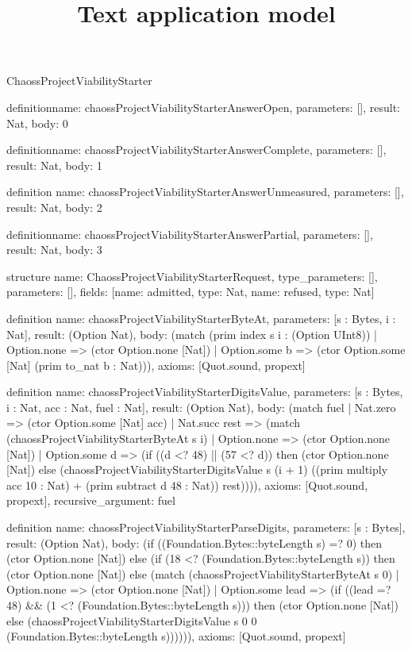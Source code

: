\begin{lexlean}{ChaossProjectViabilityStarter}
\title{Text application model}
\begin{semanticmodule}
definition{name: chaossProjectViabilityStarterAnswerOpen, parameters: [], result: Nat, body: 0}

definition{name: chaossProjectViabilityStarterAnswerComplete, parameters: [], result: Nat, body: 1}

definition{
  name: chaossProjectViabilityStarterAnswerUnmeasured,
  parameters: [],
  result: Nat,
  body: 2
}

definition{name: chaossProjectViabilityStarterAnswerPartial, parameters: [], result: Nat, body: 3}

structure{
  name: ChaossProjectViabilityStarterRequest,
  type_parameters: [],
  parameters: [],
  fields: [{name: admitted, type: Nat}, {name: refused, type: Nat}]
}

definition{
  name: chaossProjectViabilityStarterByteAt,
  parameters: [s : Bytes, i : Nat],
  result: (Option Nat),
  body: (match (prim index s i : (Option UInt8))
    | Option.none => (ctor Option.none [Nat])
    | Option.some b => (ctor Option.some [Nat] (prim to_nat b : Nat))),
  axioms: [Quot.sound, propext]
}

definition{
  name: chaossProjectViabilityStarterDigitsValue,
  parameters: [s : Bytes, i : Nat, acc : Nat, fuel : Nat],
  result: (Option Nat),
  body: (match fuel
    | Nat.zero => (ctor Option.some [Nat] acc)
    | Nat.succ rest => (match (chaossProjectViabilityStarterByteAt s i)
      | Option.none => (ctor Option.none [Nat])
      | Option.some d => (if ((d <? 48) || (57 <? d)) then (ctor Option.none [Nat]) else (chaossProjectViabilityStarterDigitsValue s (i + 1) ((prim multiply acc 10 : Nat) + (prim subtract d 48 : Nat)) rest)))),
  axioms: [Quot.sound, propext],
  recursive_argument: fuel
}

definition{
  name: chaossProjectViabilityStarterParseDigits,
  parameters: [s : Bytes],
  result: (Option Nat),
  body: (if ((Foundation.Bytes::byteLength s) =? 0) then (ctor Option.none [Nat]) else (if (18 <? (Foundation.Bytes::byteLength s)) then (ctor Option.none [Nat]) else (match (chaossProjectViabilityStarterByteAt s 0)
    | Option.none => (ctor Option.none [Nat])
    | Option.some lead => (if ((lead =? 48) && (1 <? (Foundation.Bytes::byteLength s))) then (ctor Option.none [Nat]) else (chaossProjectViabilityStarterDigitsValue s 0 0 (Foundation.Bytes::byteLength s)))))),
  axioms: [Quot.sound, propext]
}


\end{semanticmodule}
\end{lexlean}
